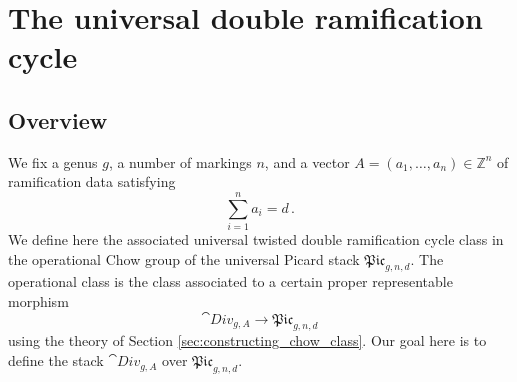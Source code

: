 \documentclass[a4paper,12pt]{article} %
\newcommand{\on}[1]{\operatorname{#1}}
\newcommand{\bb}[1]{{\mathbb{#1}}}
\theoremstyle{definition}
\newtheorem{remark}[definition]{Remark}
\theoremstyle{plain}%
\newcommand{\Picabs}{\mathfrak{Pic}}
\newcommand{\Chow}{\mathsf{CH}}
\newcommand{\CHop}{\Chow_{\mathsf{op}}}
\newcommand{\jocomment}[1]{}
\begin{document}

\section{The universal double ramification cycle}\label{sec:uni_DR_defs}
\subsection{Overview}
We fix a genus $g$, a number of markings $n$, and a vector $A=(a_1,\ldots,a_n) \in \bb Z^n$
of ramification data satisfying
$$\sum_{i=1}^{n}a_i=d\, .$$
We define here 
the associated universal twisted double ramification cycle class
in the operational Chow group of the universal Picard stack $\Picabs_{g,n,d}$.
The operational class is the class associated to a certain proper
representable
morphism 
$$\cat{Div}_{g,A} \to \Picabs_{g,n,d}$$
using the theory of Section \ref{sec:constructing_chow_class}.
Our goal here is to define the stack $\cat{Div}_{g,A}$ over $\Picabs_{g,n,d}$. 

\end{document}
